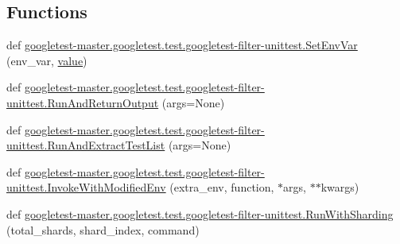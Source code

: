 \subsection*{Functions}
\begin{DoxyCompactItemize}
\item 
def \mbox{\hyperlink{namespacegoogletest-master_1_1googletest_1_1test_1_1googletest-filter-unittest_afb1b504e097c1bf6246243803354a46b}{googletest-\/master.\+googletest.\+test.\+googletest-\/filter-\/unittest.\+Set\+Env\+Var}} (env\+\_\+var, \mbox{\hyperlink{_obj__test_2lib_2googletest-master_2googlemock_2test_2gmock-matchers__test_8cc_a337b8a670efc0b086ad3af163f3121b6}{value}})
\item 
def \mbox{\hyperlink{namespacegoogletest-master_1_1googletest_1_1test_1_1googletest-filter-unittest_a1b526423ac72dca36b8ca7c8b4c8f25a}{googletest-\/master.\+googletest.\+test.\+googletest-\/filter-\/unittest.\+Run\+And\+Return\+Output}} (args=None)
\item 
def \mbox{\hyperlink{namespacegoogletest-master_1_1googletest_1_1test_1_1googletest-filter-unittest_a18d060186cd1bd2592dce0761ec029e5}{googletest-\/master.\+googletest.\+test.\+googletest-\/filter-\/unittest.\+Run\+And\+Extract\+Test\+List}} (args=None)
\item 
def \mbox{\hyperlink{namespacegoogletest-master_1_1googletest_1_1test_1_1googletest-filter-unittest_a7e4dd2054503003db0d6b42edc1c6815}{googletest-\/master.\+googletest.\+test.\+googletest-\/filter-\/unittest.\+Invoke\+With\+Modified\+Env}} (extra\+\_\+env, function, $\ast$args, $\ast$$\ast$kwargs)
\item 
def \mbox{\hyperlink{namespacegoogletest-master_1_1googletest_1_1test_1_1googletest-filter-unittest_a9fe0857d188f2b2832d1dc102f5ca71a}{googletest-\/master.\+googletest.\+test.\+googletest-\/filter-\/unittest.\+Run\+With\+Sharding}} (total\+\_\+shards, shard\+\_\+index, command)
\end{DoxyCompactItemize}
